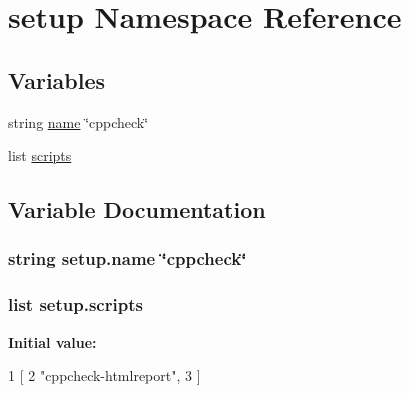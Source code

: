 \hypertarget{namespacesetup}{\section{setup Namespace Reference}
\label{namespacesetup}
}
\subsection*{Variables}
\begin{DoxyCompactItemize}
\item 
string \hyperlink{namespacesetup_a61de3710bf6c9d78c0afa352263f8b09}{name} \char`\"{}cppcheck\char`\"{}
\item 
list \hyperlink{namespacesetup_ac1f45f8d37050b278bf63c812b1130dd}{scripts}
\end{DoxyCompactItemize}


\subsection{Variable Documentation}
\hypertarget{namespacesetup_a61de3710bf6c9d78c0afa352263f8b09}{
\subsubsection[{name}]{\setlength{\rightskip}{0pt plus 5cm}string setup.\-name \char`\"{}cppcheck\char`\"{}}}\label{namespacesetup_a61de3710bf6c9d78c0afa352263f8b09}
\hypertarget{namespacesetup_ac1f45f8d37050b278bf63c812b1130dd}{
\subsubsection[{scripts}]{\setlength{\rightskip}{0pt plus 5cm}list setup.\-scripts}}\label{namespacesetup_ac1f45f8d37050b278bf63c812b1130dd}
{\bfseries Initial value\-:}
\begin{DoxyCode}
1 [
2             \textcolor{stringliteral}{"cppcheck-htmlreport"},
3             ]
\end{DoxyCode}

